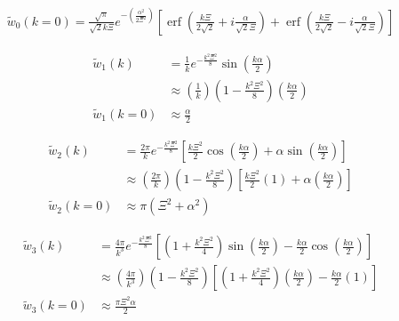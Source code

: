 \documentclass[double,12pt]{beavtex}
\begin{document}
\begin{align}
    \widetilde{w}_0(k=0)=\frac{\sqrt{\pi}}{\sqrt{2}k\Xi}e^{-\left(\frac{\alpha^2}{2\Xi^2}\right)}\left[\operatorname{erf}
                         \left(\frac{k\Xi}{2\sqrt{2}}+i\frac{\alpha}{\sqrt{2}\Xi}\right)
                         +\operatorname{erf}\left(\frac{k\Xi}{2\sqrt{2}}-i\frac{\alpha}{\sqrt{2}\Xi}\right)\right]
\end{align}

\begin{align}
    \widetilde{w}_1(k) &= \frac{1}{k}e^{-\frac{k^2\Xi^2}{8}}\sin\left(\frac{k\alpha}{2}\right)  \\
  & \approx\left(\frac{1}{k}\right)\left(1-\frac{k^2\Xi^2}{8}\right)\left(\frac{k\alpha}{2}\right)  \\
  \widetilde{w}_1(k=0) & \approx\frac{\alpha}{2}
\end{align}

\begin{align}
     \widetilde{w}_2(k) &= \frac{2\pi}{k}e^{-\frac{k^2\Xi^2}{8}}
       \left[\frac{k\Xi^2}{2}\cos\left(\frac{k\alpha}{2}\right)
       +\alpha\sin\left(\frac{k\alpha}{2}\right)\right] \\
       &  \approx\left(\frac{2\pi}{k}\right)\left(1-\frac{k^2\Xi^2}{8}\right)
       \left[\frac{k\Xi^2}{2}\left(1\right)+\alpha\left(\frac{k\alpha}{2}\right)\right] \\
       \widetilde{w}_2(k=0) & \approx \pi(\Xi^2 + \alpha^2)
\end{align}

\begin{align}
     \widetilde{w}_3(k) &= \frac{4\pi}{k^3}e^{-\frac{k^2\Xi^2}{8}}
       \left[\left(1+\frac{k^2\Xi^2}{4}\right)\sin\left(\frac{k\alpha}{2}\right)
       -\frac{k\alpha}{2}\cos\left(\frac{k\alpha}{2}\right)\right] \\
       & \approx \left(\frac{4\pi}{k^3}\right)\left(1-\frac{k^2\Xi^2}{8}\right)
          \left[\left(1+\frac{k^2\Xi^2}{4}\right)\left(\frac{k\alpha}{2}\right)-\frac{k\alpha}{2}\left(1\right)\right] \\
       \widetilde{w}_3(k=0) & \approx \frac{\pi\Xi^2\alpha}{2}
\end{align}
\end{document}

